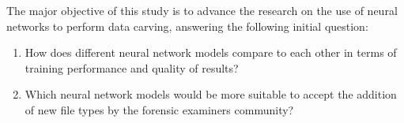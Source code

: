 
The major objective of this study is to advance the research on the use of neural networks to perform data carving, answering the following initial question:

\begin{enumerate}[itemindent=\parindent,label=\textbf{Q\arabic*.}]

    \item How does different neural network models compare to each other in terms of training performance and quality of results?
    
    \item Which neural network models would be more suitable to accept the addition of new file types by the forensic examiners community? 

\end{enumerate}
